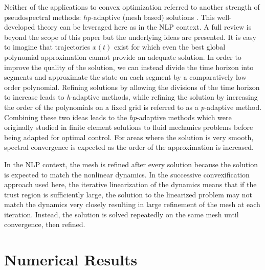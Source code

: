 \documentclass[10pt,a4paper]{article}
\begin{document}
	Neither of the applications \cite{PS_Convex,PS_Convex_ascent} to convex optimization referred to another strength of pseudospectral methods: $ hp $-adaptive (mesh based) solutions \cite{GPOPS,hp_adapt}. This well-developed theory can be leveraged here as in the NLP context. A full review is beyond the scope of this paper but the underlying ideas are presented. It is easy to imagine that trajectories $x(t)$ exist for which even the best global polynomial approximation cannot provide an adequate solution. In order to improve the quality of the solution, we can instead divide the time horizon into segments and approximate the state on each segment by a comparatively low order polynomial. Refining solutions by allowing the divisions of the time horizon to increase leads to \textit{h}-adaptive methods, while refining the solution by increasing the order of the polynomials on a fixed grid is referred to as a \textit{p}-adaptive method. Combining these two ideas leads to the \textit{hp}-adaptive methods which were originally studied in finite element solutions to fluid mechanics problems \cite{HPAdapt_origin} before being adapted for optimal control. For areas where the solution is very smooth, spectral convergence is expected as the order of the approximation is increased.
	
	In the NLP context, the mesh is refined after every solution because the solution is expected to match the nonlinear dynamics. In the successive convexification approach used here, the iterative linearization of the dynamics means that if the trust region is sufficiently large, the solution to the linearized problem may not match the dynamics very closely resulting in large refinement of the mesh at each iteration. Instead, the solution is solved repeatedly on the same mesh until convergence, then refined.
	
	
	\section{Numerical Results}

	
\end{document}
